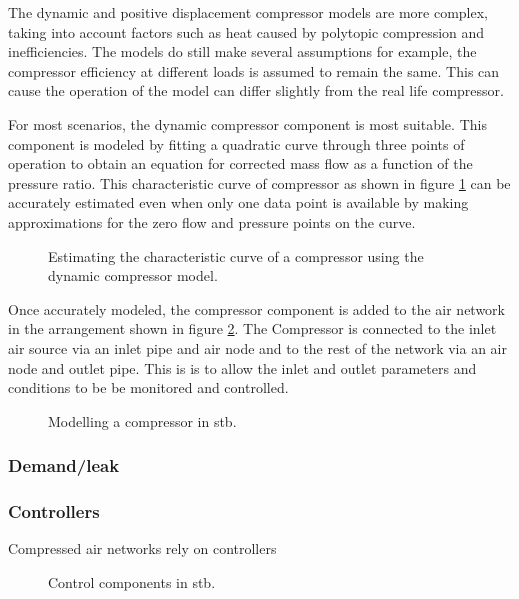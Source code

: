 		The dynamic and positive displacement compressor models are more complex, taking into account factors such as heat caused by polytopic compression and inefficiencies. The models do still make several assumptions for example, the compressor efficiency at different loads is assumed to remain the same. This can cause the operation of the model can differ slightly from the real life compressor.
		\par 	 
		For most scenarios, the dynamic compressor component is most suitable. This component is modeled by fitting a quadratic curve through three points of operation to obtain an equation for corrected mass flow as a function of the pressure ratio. This characteristic curve of compressor  as shown in figure \ref{fig: Compressor Curve} can be accurately estimated even when only one data point is available by making approximations for the zero flow and pressure points on the curve.
		\begin{figure}[h]
			\centering
			\fbox{}
			\caption{Estimating the characteristic curve of a compressor using the dynamic compressor model.}
			\label{fig: Compressor Curve}
		\end{figure}
		\par
		Once accurately modeled, the compressor component is added to the air network in the arrangement shown in figure \ref{fig: Compressor models}. The Compressor is connected to the inlet air source via an inlet pipe and air node and to the rest of the network via an air node and outlet pipe. This is is to allow the inlet and outlet parameters and conditions to be be monitored and controlled.
		\begin{figure}[h]
			\centering
			\caption{Modelling a compressor in \gls{stb}.}
			\label{fig: Compressor models}
		\end{figure}		

		\subsubsection{Demand/leak}
	
		\subsubsection{Controllers}
		Compressed air networks rely on controllers
\begin{figure}[h]
	\centering
	\caption{Control components in \gls{stb}.}
	\label{fig: Controller models}
\end{figure}
